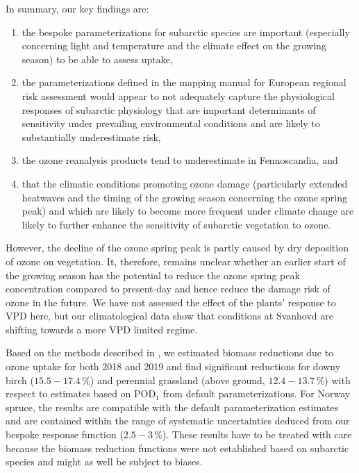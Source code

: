 \documentclass[bg, manuscript]{copernicus}
\begin{document}
In summary, our key findings are:
\begin{enumerate}
   \itemsep0pt
 \item the bespoke parameterizations for subarctic species are important (especially concerning light and temperature and the climate effect on the growing season) to be able to assess  uptake,
 \item the parameterizations defined in the mapping manual for European regional risk assessment would appear to not adequately capture the physiological responses of subarctic physiology that are important determinants of \chem{[O_3]} sensitivity under prevailing environmental conditions and are likely to substantially underestimate risk,
 \item the ozone reanalysis products tend to underestimate \chem{[O_3]} in Fennoscandia, and
 \item that the climatic conditions promoting ozone damage (particularly extended heatwaves and the timing of the growing season concerning the ozone spring peak) and which are likely to become more frequent under climate change are likely to further enhance the sensitivity of subarctic vegetation to ozone.
\end{enumerate}

However, the decline of the ozone spring peak is partly caused by dry deposition of ozone on vegetation. It, therefore, remains unclear whether an earlier start of the growing season has the potential to reduce the ozone spring peak concentration compared to present-day and hence reduce the damage risk of ozone in the future. 
We have not assessed the effect of the plants' response to VPD here, but our climatological data show that conditions at Svanhovd are shifting towards a more VPD limited regime.
 
Based on the methods described in \citet{ICP:MappingManual2017}, we estimated biomass reductions due to ozone uptake for both 2018 and 2019 and find significant reductions for downy birch ($15.5-17.4\,\unit{\%}$) and perennial grassland (above ground, $12.4-13.7\,\unit{\%}$) with respect to estimates based on $\mathrm{POD_1}$ from default parameterizations. For Norway spruce, the results are compatible with the default parameterization estimates and are contained within the range of systematic uncertainties deduced from our bespoke response function ($2.5-3\,\unit{\%}$). These results have to be treated with care because the biomass reduction functions were not established based on subarctic species and might as well be subject to biases.  
\end{document}
